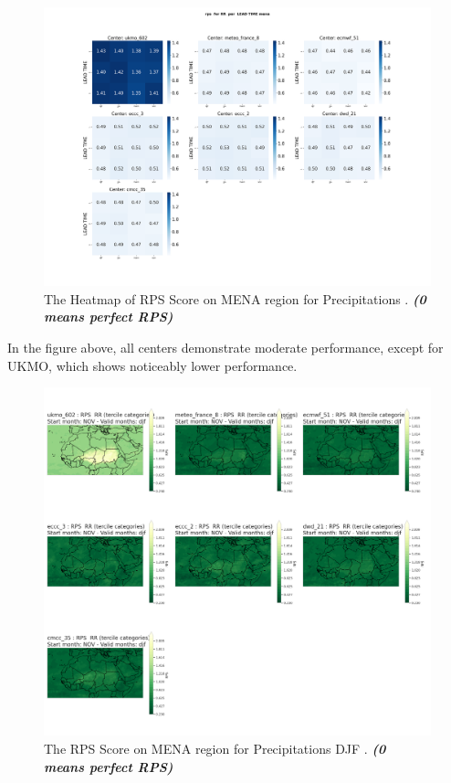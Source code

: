 \begin{figure}[H]
    \centering
    \includegraphics[scale=0.25]{plots/prob/rps/rps_RR_mena.png}
    \caption{The Heatmap of  RPS Score on MENA region for Precipitations    . \textbf{\textit{(0 means perfect RPS)}}}
\end{figure}

In the figure above, all centers demonstrate moderate performance, except for UKMO, which shows noticeably lower performance. 


\begin{figure}[H]
    \centering
    \includegraphics[scale=0.25]{plots/prob/rps/rps_djf_RR.png}
    \caption{The   RPS Score on MENA region for Precipitations DJF   . \textbf{\textit{(0 means perfect RPS)}}}
\end{figure}

